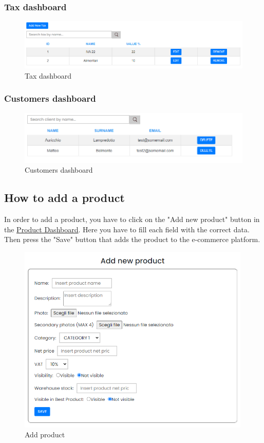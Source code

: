 \subsubsection{Tax dashboard} \label{_taxmanagement}
\begin{figure}[H]
    \centering
    \includegraphics[width=\linewidth]{res/images/venditore/taxmanagement.png}
    \caption{Tax dashboard}
\end{figure}
\subsubsection{Customers dashboard} \label{_customermanagement}
\begin{figure}[H]
    \centering
    \includegraphics[width=\linewidth]{res/images/venditore/customermanagement.png}
    \caption{Customers dashboard}
\end{figure}


\subsection{How to add a product}\label{_addProduct}
In order to add a product, you have to click on the "Add new product" button in the \hyperref[_productmanagement]{Product Dashboard}.
Here you have to fill each field with the correct data. Then press the "Save" button that adds the product to the e-commerce platform.
\begin{figure}[H]
    \centering
    \includegraphics[width=30em]{res/images/venditore/addproduct.png}
    \caption{Add product}
\end{figure}

